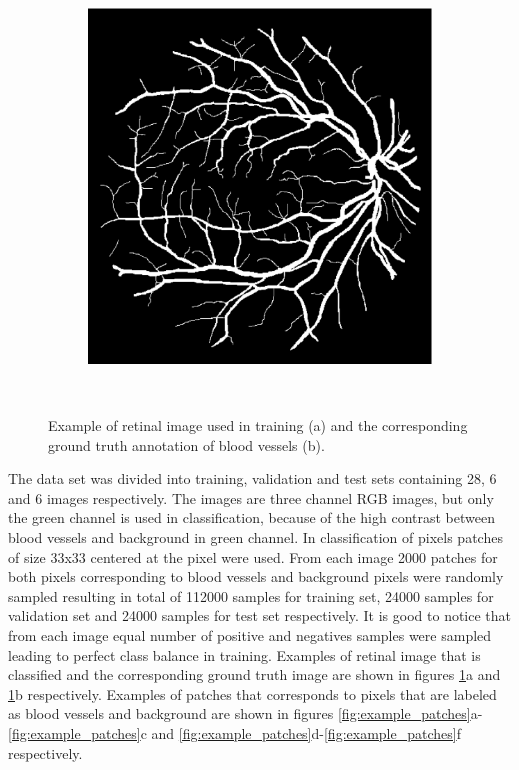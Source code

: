 \documentclass[aps,prb,10pt,twocolumn,groupedaddress]{revtex4-1}
\begin{document}
\begin{figure}[!t]
\begin{subfigure}[]{0.4\textwidth}
		\includegraphics[width=\textwidth]{images/02_manual1.eps}
		\caption{}
	\end{subfigure}\\
	\caption{Example of retinal image used in training (a) and the corresponding ground truth annotation of blood vessels (b).}
	\label{fig:example_images}
\end{figure}

The data set was divided into training, validation and test sets containing 28, 6 and 6 images respectively. The images are three channel RGB images, but only the green channel is used in classification, because of the high contrast between blood vessels and background in green channel\cite{green_contrast}. In classification of pixels patches of size 33x33 centered at the pixel were used. From each image 2000 patches for both pixels corresponding to blood vessels and background pixels were randomly sampled resulting in total of 112000 samples for training set, 24000 samples for validation set and 24000 samples for test set respectively. It is good to notice that from each image equal number of positive and negatives samples were sampled leading to perfect class balance in training. Examples of retinal image that is classified and the corresponding ground truth image are shown in figures \ref{fig:example_images}a and \ref{fig:example_images}b respectively. Examples of patches that corresponds to pixels that are labeled as blood vessels and background are shown in figures \ref{fig:example_patches}a-\ref{fig:example_patches}c and \ref{fig:example_patches}d-\ref{fig:example_patches}f respectively.
\end{document}

